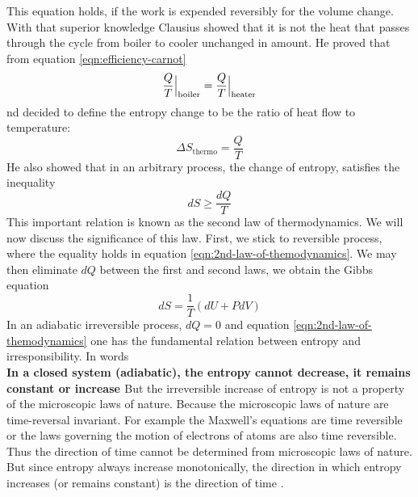 	This equation holds, if the work is expended reversibly for the volume change. With that superior	knowledge Clausius showed that it is not the heat that passes through the cycle from boiler to	cooler unchanged in amount. He proved that from equation \ref{eqn:efficiency-carnot}
	\begin{equation}
		\frac{Q}{T}\at[\Big]{\text{boiler}} =
		\frac{Q}{T}\at[\Big]{\text{heater}}
	\end{equation}
	nd decided to define the entropy change to be the ratio of heat flow to temperature: \cite{Sethna2006}
	\begin{equation}
		\Delta S_{\text{thermo}} = \frac{Q}{T}
	\end{equation}
	He also showed that in an arbitrary process, the change of entropy, satisfies the inequality
	\begin{equation}
		dS \geq \frac{dQ}{T}
		\label{eqn:2nd-law-of-themodynamics}
	\end{equation}
	This important relation is known as the second law of thermodynamics. We will now discuss the significance of this law.
	First, we stick to reversible process, where the equality holds in equation \ref{eqn:2nd-law-of-themodynamics}. We may then eliminate $dQ$ between the first and second laws, we obtain the Gibbs equation
	\begin{equation}
		dS = \frac{1}{T} \left(dU + P dV\right)
	\end{equation}
	In an adiabatic irreversible process, $dQ = 0$ and equation \ref{eqn:2nd-law-of-themodynamics} one has the fundamental relation between entropy and irresponsibility. In words\\
	\textbf{In a closed system (adiabatic), the entropy cannot decrease, it remains constant or increase \cite{Benguigui2013}}
	But the irreversible increase of entropy is not a property of the microscopic laws of nature. Because the microscopic laws of nature are time-reversal invariant. For example the Maxwell's equations are time reversible or the laws governing the motion of electrons of atoms are also time reversible. Thus the direction of time cannot be determined from microscopic laws of nature. But since entropy always increase monotonically, the direction in which entropy increases (or remains constant) is the direction of time \cite{Sethna2006}.
